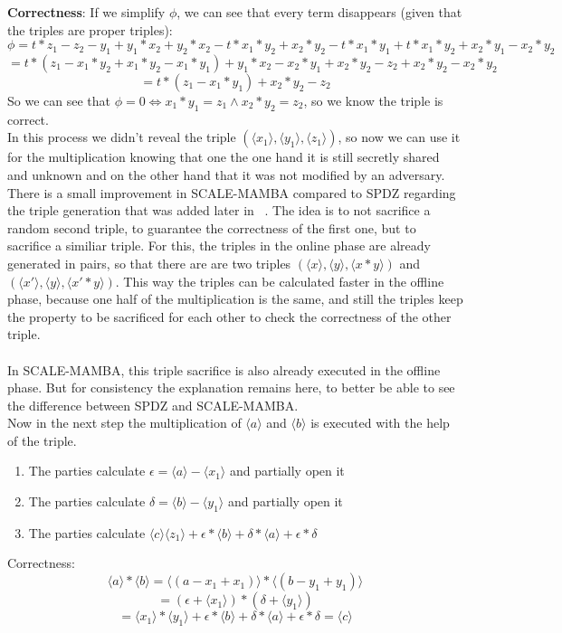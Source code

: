 \documentclass[english,runningheads,a4paper]{llncs}[2018/03/10]
\begin{document}
\textbf{Correctness}: If we simplify \( \phi \), we can see that every term disappears (given that the triples are proper triples):
$$\phi = t*z_1 - z_2 - y_1 + y_1*x_2 + y_2 * x_2 - t * x_1 * y_2 + x_2*y_2 - t*x_1*y_1 + t*x_1*y_2 + x_2*y_1 - x_2*y_2$$
$$ = t*(z_1 - x_1*y_2+x_1*y_2 -x_1*y_1) + y_1*x_2 - x_2*y_1+ x_2*y_2 - z_2 + x_2*y_2 -  x_2*y_2$$
$$= t* (z_1 - x_1*y_1) + x_2*y_2 - z_2 $$
So we can see that \( \phi = 0 \Leftrightarrow x_1 * y_1 = z_1 \land x_2*y_2=z_2 \), so we know the triple is correct. \\
In this process we didn't reveal the triple \( (\langle x_1 \rangle ,\langle y_1\rangle , \langle z_1\rangle ) \), so now we can use it for the multiplication knowing that one the one hand it is still secretly shared and unknown and on the other hand that it was not modified by an adversary.\\


There is a small improvement in SCALE-MAMBA compared to SPDZ regarding the triple generation that was added later in ~\cite{cryptoeprint:2017:123}. The idea is to not sacrifice a random second triple, to guarantee the correctness of the first one, but to sacrifice a similiar triple. For this, the triples in the online phase are already generated in pairs, so that there are are two triples \( (\langle x \rangle ,\langle y \rangle , \langle x*y \rangle ) \) and \( (\langle x' \rangle ,\langle y\rangle , \langle x'*y\rangle ) \). This way the triples can be calculated faster in the offline phase, because one half of the multiplication is the same, and still the triples keep the property to be sacrificed for each other to check the correctness of the other triple.\\\\

In SCALE-MAMBA, this triple sacrifice is also already executed in the offline phase. But for consistency the explanation remains here, to better be able to see the difference between SPDZ and SCALE-MAMBA.\\


Now in the next step the multiplication of \(\langle a \rangle \) and \(\langle b \rangle \) is executed with the help of the triple.
\begin{enumerate}
\item The parties calculate \( \epsilon = \langle a \rangle - \langle x_1 \rangle \) and partially open it
\item The parties calculate \( \delta = \langle b \rangle - \langle y_1 \rangle \) and partially open it
\item The parties calculate \( \langle c \rangle \langle z_1 \rangle + \epsilon * \langle b \rangle + \delta * \langle a \rangle + \epsilon * \delta \) 
\end{enumerate}
Correctness: 
$$  \langle a \rangle * \langle b \rangle = \langle (a-x_1+x_1) \rangle * \langle (b-y_1+y_1) \rangle$$
$$ = ( \epsilon  +\langle  x_1 \rangle ) * ( \delta  + \langle y_1 \rangle )$$
$$ = \langle x_1 \rangle * \langle y_1 \rangle + \epsilon * \langle b \rangle + \delta * \langle a \rangle + \epsilon * \delta =  \langle c \rangle $$
\end{document}

